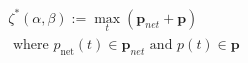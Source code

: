 \begin{equation}
\begin{split}
	\zeta^*(\alpha,\beta) := \max_t(\textbf{p}_{net} + \textbf{p})\\
	\text{ where } p_\text{net}(t) \in \textbf{p}_{net} \text{ and } p(t) \in \textbf{p}
\end{split}
\label{ch2:equ:dynamic-cost}
\end{equation}
